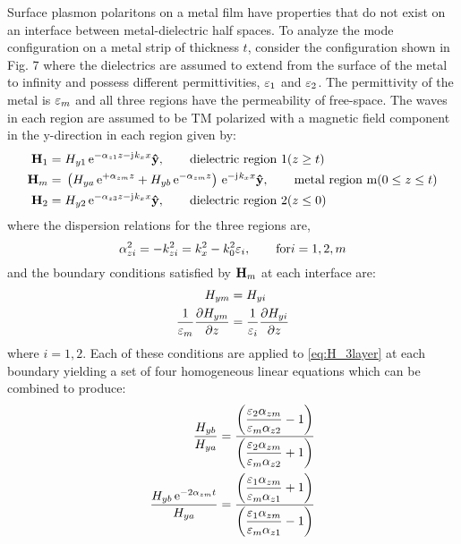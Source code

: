 \documentclass[11pt]{article}
\begin{document}
Surface plasmon polaritons on a metal film have properties that do not exist on an interface between metal-dielectric half spaces. To analyze the mode configuration on a metal strip of thickness $t$, consider the configuration shown in Fig. 7 where the dielectrics are assumed to extend from the surface of the metal to infinity and possess different permittivities, $\varepsilon_1$ and $\varepsilon_2$. The permittivity of the metal is $\varepsilon_m$ and all three regions have the permeability of free-space. The waves in each region are assumed to be TM polarized with a magnetic field component in the y-direction in each region given by:
%
%
\begin{subequations}
  \begin{align}
    \v H_1 ={}& H_{y1} \, \e^{ -\A_{z1}z - \j k_x x}\v{\^{y}}, \qquad	 		\text{dielectric region 1} (z \ge t)
    \label{eq:H1_3layer}\\
    \v H_m ={}& \left( H_{ya}\, \e^{ +\A_{zm}z} + H_{yb}\, \e^{ -\A_{zm}z} \right) \, \e^{ - \j k_x x}\v{\^{y}}, \qquad	 		\text{metal region m} (0 \le z \le t)
    \label{eq:Hm_3layer}\\
    \v H_2 ={}& H_{y2} \, \e^{ -\A_{z3}z - \j k_x x}\v{\^{y}}, \qquad	 		\text{dielectric region 2} (z \le 0)
    \label{eq:H2_3layer}\\
  \end{align}
  \label{eq:H_3layer}\\
\end{subequations}
%
where the dispersion relations for the three regions are,
%
\begin{equation}
  \alpha_{zi}^2 = -k_{zi}^2 = k_x^2 - k_0^2 \varepsilon_i, \qquad	  \text{for}
  i=1,2,m
  \label{eq:3_layer_disp}
\end{equation}
%
and the boundary conditions satisfied by $\mathbf{H}_m$ at each interface are:
%
\begin{subequations}
  \begin{align}
    {H_{ym}} ={}& {H_{yi}}
    \label{eq:bc1_3layer}\\
    \frac{1}{\varepsilon_m}\pdv{H_{ym}}{z}  ={}& \frac{1}{\varepsilon_i}\pdv{H_{yi}}{z}
    \label{eq:bc2_3layer}
  \end{align}
  \label{eq:bc_3layer}
\end{subequations}
%
where $i = 1,2$. Each of these conditions are applied to \eqref{eq:H_3layer} at each boundary yielding a set of four homogeneous linear equations which can be combined to produce:
%
\begin{subequations}
  \begin{align}
    \frac{H_{yb}}{H_{ya}} ={}& \frac{\displaystyle \left(\frac{\varepsilon_2 \alpha_{zm}}{\varepsilon_m \alpha_{z2}} - 1 \right)}{\displaystyle \left(\frac{\varepsilon_2 \alpha_{zm}}{\varepsilon_m \alpha_{z2}} + 1 \right)}
    \label{eq:homo1_3layer}\\
    \frac{H_{yb} \, \mathrm{e}^{-2 \alpha_{zm}t}}{H_{ya}} ={}& \frac{\displaystyle \left(\frac{\varepsilon_1 \alpha_{zm}}{\varepsilon_m \alpha_{z1}} + 1 \right)}{\displaystyle \left(\frac{\varepsilon_1 \alpha_{zm}}{\varepsilon_m \alpha_{z1}} - 1 \right)}
    \label{eq:homo2_3layer}
  \end{align}
  \label{eq:homo_3layer}
\end{subequations}
\end{document}
